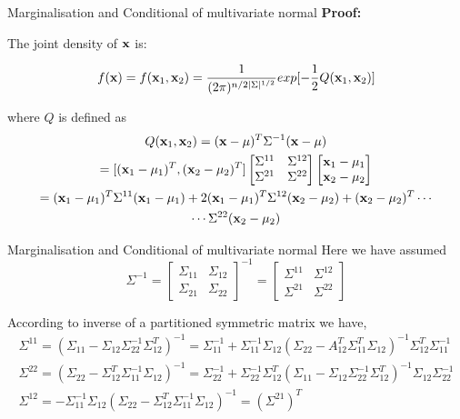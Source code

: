\documentclass{beamer}
\begin{document}
\begin{frame}{Marginalisation and Conditional of multivariate normal}
	\textbf{Proof:}
	
	The joint density of ${\bf x}$ is:
	
	\begin{equation}
	f({\bf x})=f(\mathbf{x}_1,\mathbf{x}_2)=\frac{1}{(2\pi)^{n/2\vert\Sigma\vert^{1/2}}}exp[-\frac{1}{2}Q(\mathbf{x}_1,\mathbf{x}_2)] 
	\end{equation}
	
	where $Q$ is defined as
	\begin{gather}
	Q(\mathbf{x}_1,\mathbf{x}_2) = ({\bf x}-\mu)^T\Sigma^{-1}({\bf x}-\mu)\\
	= [(\mathbf{x}_1-\mu_1)^T, (\mathbf{x}_2-\mu_2)^T] 
	\begin{bmatrix}
	\Sigma^{11} & \Sigma^{12}\\
	\Sigma^{21} & \Sigma^{22}
	\end{bmatrix}
	\begin{bmatrix}
	\mathbf{x}_1-\mu_1 \\
	\mathbf{x}_2-\mu_2
	\end{bmatrix}\\
	= (\mathbf{x}_1-\mu_1)^T\Sigma^{11}(\mathbf{x}_1-\mu_1)+ 2(\mathbf{x}_1-\mu_1)^T\Sigma^{12}(\mathbf{x}_2-\mu_2) + (\mathbf{x}_2-\mu_2)^T \cdots \\
	\cdots \Sigma^{22}(\mathbf{x}_2-\mu_2)
	\end{gather}
\end{frame}

\begin{frame}{Marginalisation and Conditional of multivariate normal}
	Here we have assumed 
	$$	
	\Sigma^{-1}=\left[\begin{array}{cc}
	{\Sigma_{11}} & {\Sigma_{12}} \\
	{\Sigma_{21}} & {\Sigma_{22}}
	\end{array}\right]^{-1}=\left[\begin{array}{cc}
	{\Sigma^{11}} & {\Sigma^{12}} \\
	{\Sigma^{21}} & {\Sigma^{22}}
	\end{array}\right]
	$$
	
	According to inverse of a partitioned symmetric matrix we have, 
	\begin{gather}
	\Sigma^{11}=\left(\Sigma_{11}-\Sigma_{12} \Sigma_{22}^{-1} \Sigma_{12}^{T}\right)^{-1}=\Sigma_{11}^{-1}+\Sigma_{11}^{-1} \Sigma_{12}\left(\Sigma_{22}-A_{12}^{T} \Sigma_{11}^{T} \Sigma_{12}\right)^{-1} \Sigma_{12}^{T} \Sigma_{11}^{-1}\\
	\Sigma^{22}=\left(\Sigma_{22}-\Sigma_{12}^{T} \Sigma_{11}^{-1} \Sigma_{12}\right)^{-1}=\Sigma_{22}^{-1}+\Sigma_{22}^{-1} \Sigma_{12}^{T}\left(\Sigma_{11}-\Sigma_{12} \Sigma_{22}^{-1} \Sigma_{12}^{T}\right)^{-1} \Sigma_{12} \Sigma_{22}^{-1}\\
	\Sigma^{12}=-\Sigma_{11}^{-1} \Sigma_{12}\left(\Sigma_{22}-\Sigma_{12}^{T} \Sigma_{11}^{-1} \Sigma_{12}\right)^{-1}=\left(\Sigma^{21}\right)^{T}
	\end{gather}
	
\end{frame}
\end{document}
